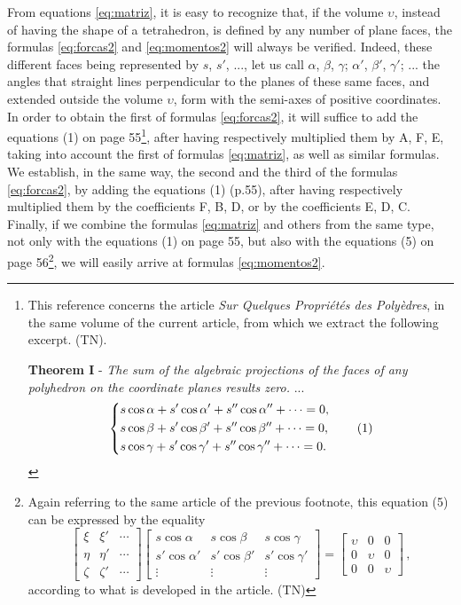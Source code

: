 \documentclass[leqno,openright,smallroyalvopaper,8pt,twoside,showtrims]{memoir}
\begin{document}
From equations \eqref{eq:matriz}, it is easy to recognize that, if the volume $\upsilon$, instead of having the shape of a tetrahedron, is defined by any number of plane faces, the formulas \eqref{eq:forcas2} and \eqref{eq:momentos2} will always be verified. Indeed, these different faces being represented by $s$, $s'$, ..., let us call $\alpha$, $\beta$, $\gamma$; $\alpha'$, $\beta'$, $\gamma'$; ... the angles that straight lines perpendicular to the planes of these same faces, and extended outside the volume $\upsilon$, form with the semi-axes of positive coordinates. In order to obtain the first of formulas \eqref{eq:forcas2}, it will suffice to add the equations (1) on page 55\footnote{This reference concerns the article \textit{Sur Quelques Propri\'et\'es des Poly\`edres}, in the same volume of the current article, from which we extract the following excerpt. (TN).

\noindent\textbf{Theorem I} - \emph{The sum of the algebraic projections of the faces of any polyhedron on the coordinate planes results zero.} ...
\begin{equation*}
   \begin{dcases}
s\cos\alpha+s'\cos\alpha'+s''\cos\alpha''+\cdots = 0,\\
s\cos\beta+s'\cos\beta'+s''\cos\beta''+\cdots = 0,\\
s\cos\gamma+s'\cos\gamma'+s''\cos\gamma''+\cdots = 0.
    \end{dcases}\tag{1}
 \end{equation*}
}, after having respectively multiplied them by A, F, E, taking into account the first of formulas \eqref{eq:matriz}, as well as similar formulas. We establish, in the same way, the second and the third of the formulas \eqref{eq:forcas2}, by adding the equations (1) (p.55), after having respectively multiplied them by the coefficients F, B, D, or by the coefficients E, D, C. Finally, if we combine the formulas \eqref{eq:matriz} and others from the same type, not only with the equations (1) on page 55, but also with the equations (5) on page 56\footnote{Again referring to the same article of the previous footnote, this equation (5) can be expressed by the equality
\begin{equation}\left[
   \begin{array}{ccc}
\xi & \xi' & \cdots\\
\eta & \eta' & \cdots\\
\zeta & \zeta' & \cdots
    \end{array}\right]\left[
   \begin{array}{ccc}
s\cos\alpha & s\cos\beta  & s\cos\gamma\\
s'\cos\alpha' & s'\cos\beta' & s'\cos\gamma'\\
\vdots & \vdots & \vdots
    \end{array}\right]=\left[
   \begin{array}{ccc}
\upsilon & 0 & 0\\
0 & \upsilon & 0\\
0 & 0 & \upsilon
    \end{array}\right]\,,\tag{5}
 \end{equation}
according to what is developed in the article. (TN)
}, we will easily arrive at formulas \eqref{eq:momentos2}. 
\end{document}
